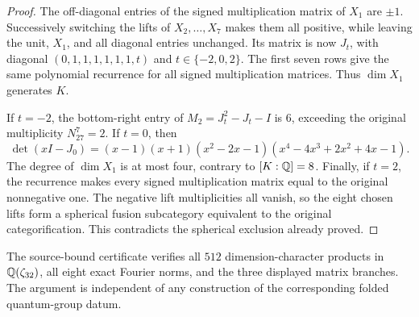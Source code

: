 \begin{proof}
The off-diagonal entries of the signed multiplication matrix of
$X_1$ are $\pm1$.  Successively switching the lifts of
$X_2,\ldots,X_7$ makes them all positive, while leaving the unit,
$X_1$, and all diagonal entries unchanged.  Its matrix is now $J_t$,
with diagonal $(0,1,1,1,1,1,1,t)$ and $t\in\{-2,0,2\}$.
The first seven rows give the same polynomial recurrence for all
signed multiplication matrices.  Thus $\dim X_1$ generates $K$.

If $t=-2$, the bottom-right entry of
$M_2=J_t^2-J_t-I$ is $6$, exceeding the original multiplicity
$N_{27}^{7}=2$.  If $t=0$, then
\[
 \det(xI-J_0)=(x-1)(x+1)(x^2-2x-1)
                    (x^4-4x^3+2x^2+4x-1).
\]
The degree of $\dim X_1$ is at most four, contrary to $[K:\mathbb Q]=8$.
Finally, if $t=2$, the recurrence makes every signed multiplication
matrix equal to the original nonnegative one.  The negative lift
multiplicities all vanish, so the eight chosen lifts form a spherical
fusion subcategory equivalent to the original categorification.
This contradicts the spherical exclusion already proved.
\end{proof}

The source-bound certificate verifies all $512$ dimension-character
products in $\mathbb Q(\zeta_{32})$, all eight exact Fourier norms, and
the three displayed matrix branches.  The argument is independent
of any construction of the corresponding folded quantum-group datum.
